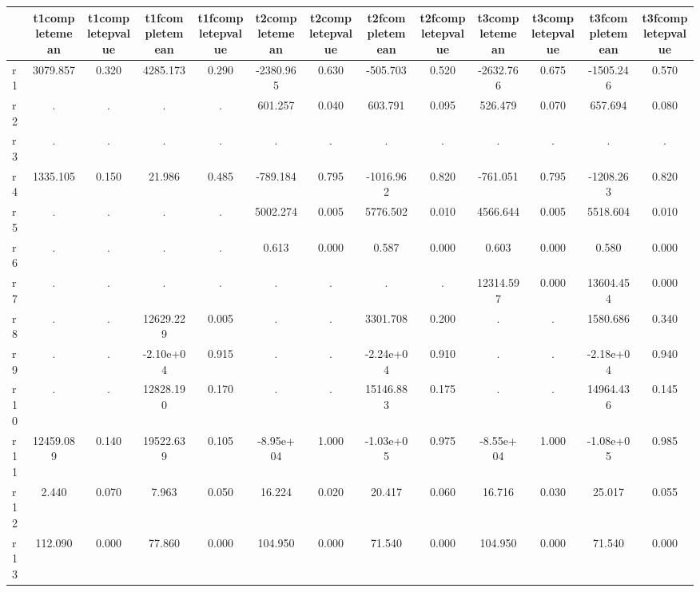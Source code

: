 \begin{table}[htbp]
\begin{tabular}{lcccccccccccc} \hline \hline
 & t1completemean  & t1completepvalue  & t1fcompletemean  & t1fcompletepvalue  & t2completemean  & t2completepvalue  & t2fcompletemean  & t2fcompletepvalue  & t3completemean  & t3completepvalue  & t3fcompletemean  & t3fcompletepvalue  \\  \hline 
r1 &  3079.857 &     0.320 &  4285.173 &     0.290 & -2380.965 &     0.630 &  -505.703 &     0.520 & -2632.766 &     0.675 & -1505.246 &     0.570 \\  
r2 &         . &         . &         . &         . &   601.257 &     0.040 &   603.791 &     0.095 &   526.479 &     0.070 &   657.694 &     0.080 \\  
r3 &         . &         . &         . &         . &         . &         . &         . &         . &         . &         . &         . &         . \\  
r4 &  1335.105 &     0.150 &    21.986 &     0.485 &  -789.184 &     0.795 & -1016.962 &     0.820 &  -761.051 &     0.795 & -1208.263 &     0.820 \\  
r5 &         . &         . &         . &         . &  5002.274 &     0.005 &  5776.502 &     0.010 &  4566.644 &     0.005 &  5518.604 &     0.010 \\  
r6 &         . &         . &         . &         . &     0.613 &     0.000 &     0.587 &     0.000 &     0.603 &     0.000 &     0.580 &     0.000 \\  
r7 &         . &         . &         . &         . &         . &         . &         . &         . & 12314.597 &     0.000 & 13604.454 &     0.000 \\  
r8 &         . &         . & 12629.229 &     0.005 &         . &         . &  3301.708 &     0.200 &         . &         . &  1580.686 &     0.340 \\  
r9 &         . &         . & -2.10e+04 &     0.915 &         . &         . & -2.24e+04 &     0.910 &         . &         . & -2.18e+04 &     0.940 \\  
r10 &         . &         . & 12828.190 &     0.170 &         . &         . & 15146.883 &     0.175 &         . &         . & 14964.436 &     0.145 \\  
r11 & 12459.089 &     0.140 & 19522.639 &     0.105 & -8.95e+04 &     1.000 & -1.03e+05 &     0.975 & -8.55e+04 &     1.000 & -1.08e+05 &     0.985 \\  
r12 &     2.440 &     0.070 &     7.963 &     0.050 &    16.224 &     0.020 &    20.417 &     0.060 &    16.716 &     0.030 &    25.017 &     0.055 \\  
r13 &   112.090 &     0.000 &    77.860 &     0.000 &   104.950 &     0.000 &    71.540 &     0.000 &   104.950 &     0.000 &    71.540 &     0.000 \\  
\hline \hline \end{tabular}
\end{table}
